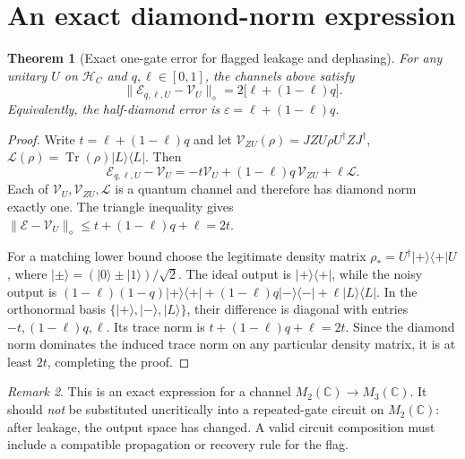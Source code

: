 \documentclass[11pt,a4paper]{article}
\newtheorem{theorem}{Theorem}[section]
\theoremstyle{remark}
\newtheorem{remark}[theorem]{Remark}
\newcommand{\Cd}{\mathbb{C}}
\begin{document}
\section{An exact diamond-norm expression}
\begin{theorem}[Exact one-gate error for flagged leakage and dephasing]\label{thm:exact}
For any unitary $U$ on $\mathcal H_C$ and $q,\ell\in[0,1]$, the channels above satisfy
\begin{equation}\boxed{
\|\mathcal E_{q,\ell,U}-\mathcal V_U\|_\diamond
=2\big[\ell+(1-\ell)q\big].}\label{eq:exact}
\end{equation}
Equivalently, the half-diamond error is $\varepsilon=\ell+(1-\ell)q$.
\end{theorem}
\begin{proof}
Write $t=\ell+(1-\ell)q$ and let $\mathcal V_{ZU}(\rho)=JZU\rho U^\dagger ZJ^\dagger$, $\mathcal L(\rho)=\operatorname{Tr}(\rho)|L\rangle\langle L|$. Then
\begin{equation}
\mathcal E_{q,\ell,U}-\mathcal V_U
=-t\mathcal V_U+(1-\ell)q\,\mathcal V_{ZU}+\ell\mathcal L.
\end{equation}
Each of $\mathcal V_U,\mathcal V_{ZU},\mathcal L$ is a quantum channel and therefore has diamond norm exactly one. The triangle inequality gives
$\|\mathcal E-\mathcal V_U\|_\diamond\le t+(1-\ell)q+\ell=2t$.

For a matching lower bound choose the legitimate density matrix $\rho_*=U^\dagger|+\rangle\langle+|U$, where $|\pm\rangle=(|0\rangle\pm|1\rangle)/\sqrt2$. The ideal output is $|+\rangle\langle+|$, while the noisy output is
$(1-\ell)(1-q)|+\rangle\langle+|+(1-\ell)q|-\rangle\langle-|+\ell|L\rangle\langle L|$.
In the orthonormal basis $\{|+\rangle,|-\rangle,|L\rangle\}$, their difference is diagonal with entries $-t,(1-\ell)q,\ell$. Its trace norm is $t+(1-\ell)q+\ell=2t$. Since the diamond norm dominates the induced trace norm on any particular density matrix, it is at least $2t$, completing the proof.
\end{proof}

\begin{remark}
This is an exact expression for a channel $M_2(\Cd)\to M_3(\Cd)$. It should \emph{not} be substituted uncritically into a repeated-gate circuit on $M_2(\Cd)$: after leakage, the output space has changed. A valid circuit composition must include a compatible propagation or recovery rule for the flag.
\end{remark}
\end{document}
